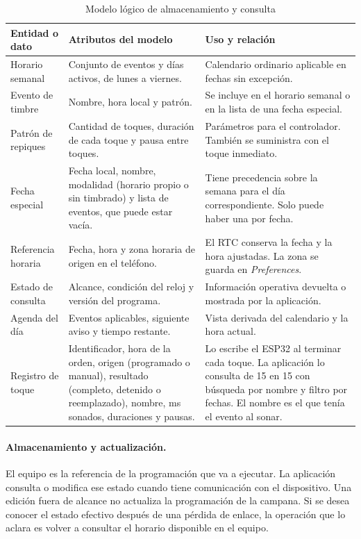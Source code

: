 \documentclass[a4paper,11pt]{article}
\begin{document}
\begin{table}[H]
\centering\small
\caption{Modelo lógico de almacenamiento y consulta}
\label{tab:datos}
\begin{tabularx}{\linewidth}{@{}P{3.17cm}YY@{}}
\toprule
\textbf{Entidad o dato} & \textbf{Atributos del modelo} & \textbf{Uso y relación} \\
\midrule
Horario semanal & Conjunto de eventos y días activos, de lunes a viernes. & Calendario ordinario aplicable en fechas sin excepción. \\
Evento de timbre & Nombre, hora local y patrón. & Se incluye en el horario semanal o en la lista de una fecha especial. \\
Patrón de repiques & Cantidad de toques, duración de cada toque y pausa entre toques. & Parámetros para el controlador. También se suministra con el toque inmediato. \\
Fecha especial & Fecha local, nombre, modalidad (horario propio o sin timbrado) y lista de eventos, que puede estar vacía. & Tiene precedencia sobre la semana para el día correspondiente. Solo puede haber una por fecha. \\
Referencia horaria & Fecha, hora y zona horaria de origen en el teléfono. & El RTC conserva la fecha y la hora ajustadas. La zona se guarda en \textit{Preferences}. \\
Estado de consulta & Alcance, condición del reloj y versión del programa. & Información operativa devuelta o mostrada por la aplicación. \\
Agenda del día & Eventos aplicables, siguiente aviso y tiempo restante. & Vista derivada del calendario y la hora actual. \\
Registro de toque & Identificador, hora de la orden, origen (programado o manual), resultado (completo, detenido o reemplazado), nombre, ms sonados, duraciones y pausas. & Lo escribe el ESP32 al terminar cada toque. La aplicación lo consulta de 15 en 15 con búsqueda por nombre y filtro por fechas. El nombre es el que tenía el evento al sonar. \\
\bottomrule
\end{tabularx}
\end{table}

\paragraph{Almacenamiento y actualización.}
El equipo es la referencia de la programación que va a ejecutar. La aplicación consulta o modifica ese estado cuando tiene comunicación con el dispositivo. Una edición fuera de alcance no actualiza la programación de la campana. Si se desea conocer el estado efectivo después de una pérdida de enlace, la operación que lo aclara es volver a consultar el horario disponible en el equipo.
\end{document}
